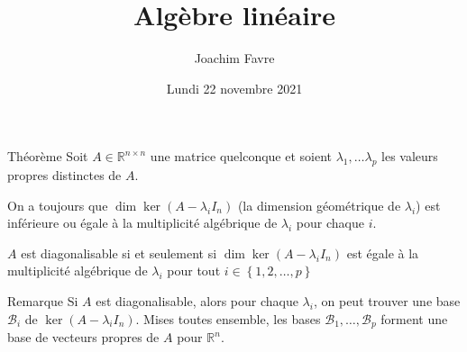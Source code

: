 \documentclass[a4paper]{article}
\title{Algèbre linéaire}
\author{Joachim Favre}
\date{Lundi 22 novembre 2021}
\begin{document}
\maketitle


\begin{parag}{Théorème}
    Soit $A \in \mathbb{R}^{n\times n}$ une matrice quelconque et soient $\lambda_1, \ldots \lambda_p$ les valeurs propres distinctes de $A$.

    On a toujours que $\dim\ker\left(A - \lambda_i I_n\right)$ (la dimension géométrique de $\lambda_i$) est inférieure ou égale à la multiplicité algébrique de $\lambda_i$ pour chaque $i$.

    $A$ est diagonalisable si et seulement si $\dim\ker\left(A - \lambda_i I_n\right)$ est égale à la multiplicité algébrique de $\lambda_i$ pour tout $i \in \left\{1, 2, \ldots, p\right\}$

    \begin{subparag}{Remarque}
        Si $A$ est diagonalisable, alors pour chaque $\lambda_i$, on peut trouver une base $\mathcal{B}_i$ de $\ker\left(A - \lambda_i I_n\right)$. Mises toutes ensemble, les bases $\mathcal{B}_1, \ldots, \mathcal{B}_p$ forment une base de vecteurs propres de $A$ pour $\mathbb{R}^{n}$.
    \end{subparag}
\end{parag}
\end{document}
